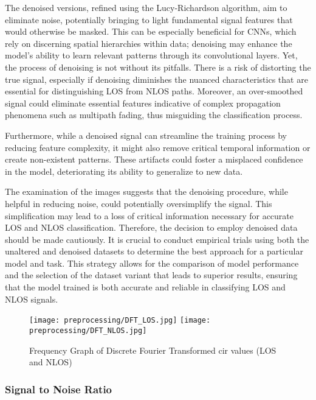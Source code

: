 The denoised versions, refined using the Lucy-Richardson algorithm, aim to eliminate noise, potentially bringing to light fundamental signal features that would otherwise be masked. This can be especially beneficial for CNNs, which rely on discerning spatial hierarchies within data; denoising may enhance the model's ability to learn relevant patterns through its convolutional layers. Yet, the process of denoising is not without its pitfalls. There is a risk of distorting the true signal, especially if denoising diminishes the nuanced characteristics that are essential for distinguishing LOS from NLOS paths. Moreover, an over-smoothed signal could eliminate essential features indicative of complex propagation phenomena such as multipath fading, thus misguiding the classification process.

Furthermore, while a denoised signal can streamline the training process by reducing feature complexity, it might also remove critical temporal information or create non-existent patterns. These artifacts could foster a misplaced confidence in the model, deteriorating its ability to generalize to new data.

The examination of the images suggests that the denoising procedure, while helpful in reducing noise, could potentially oversimplify the signal. This simplification may lead to a loss of critical information necessary for accurate LOS and NLOS classification. Therefore, the decision to employ denoised data should be made cautiously. It is crucial to conduct empirical trials using both the unaltered and denoised datasets to determine the best approach for a particular model and task. This strategy allows for the comparison of model performance and the selection of the dataset variant that leads to superior results, ensuring that the model trained is both accurate and reliable in classifying LOS and NLOS signals.

\begin{figure}[H] 
  \centering
  \texttt{[image: preprocessing/DFT\_LOS.jpg]}
  \texttt{[image: preprocessing/DFT\_NLOS.jpg]}
  \caption{Frequency Graph of Discrete Fourier Transformed \gls{cir} values (LOS and NLOS)}\label{fig:frequency_graph_dft}
\end{figure}

\subsubsection{Signal to Noise Ratio}\label{snr_visual}

